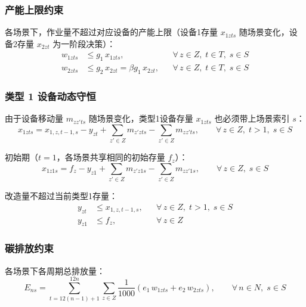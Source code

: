 \documentclass[12pt,a4paper]{article}
\newcommand{\手批注}[2]{\textcolor{#1}{\text{\kaishu #2}}}
\newcommand{\一阶段}{\textcolor{firststage}{\text{\kaishu （一阶段）}}}
\newcommand{\二阶段}{\textcolor{secondstage}{\text{\kaishu （二阶段）}}}
\begin{document}
\subsubsection{产能上限约束}

各场景下，作业量不超过对应设备的产能上限（设备1存量 $x_{1zts}$ 随场景变化，设备2存量 $x_{2zt}$ 为一阶段决策）：
\begin{align}
    w_{1zts} &\leq g_1 \, x_{1zts}, && \forall \, z \in Z, \; t \in T, \; s \in S
    \label{eq:cap1-s} \\[6pt]
    w_{2zts} &\leq g_2 \, x_{2zt} = \beta g_1 \, x_{2zt}, && \forall \, z \in Z, \; t \in T, \; s \in S
    \label{eq:cap2-s}
\end{align}

\subsubsection{类型 1 设备动态守恒}

由于设备移动量 $m_{zz'ts}$ 随场景变化，类型1设备存量 $x_{1zts}$ 也必须带上场景索引 $s$：
\begin{equation}
    x_{1zts} = x_{1,z,t-1,s} - y_{zt} + \sum_{z' \in Z} m_{z'zts} - \sum_{z' \in Z} m_{zz'ts},
    \qquad \forall \, z \in Z, \; t > 1, \; s \in S
    \label{eq:dyn1_t-s}
\end{equation}

初始期（$t=1$，各场景共享相同的初始存量 $f_z$）：
\begin{equation}
    x_{1z1s} = f_z - y_{z1} + \sum_{z' \in Z} m_{z'z1s} - \sum_{z' \in Z} m_{zz'1s},
    \qquad \forall \, z \in Z, \; s \in S
    \label{eq:dyn1_init-s}
\end{equation}

改造量不超过当前类型1存量：
\begin{align}
    y_{zt} &\leq x_{1,z,t-1,s}, && \forall \, z \in Z, \; t > 1, \; s \in S
    \label{eq:y-le-x1-s} \\[6pt]
    y_{z1} &\leq f_z, && \forall \, z \in Z
    \label{eq:y-le-f-s}
\end{align}

\subsubsection{碳排放约束}

各场景下各周期总排放量：
\begin{equation}
    E_{ns} = \sum_{t=12(n-1)+1}^{12n} \sum_{z \in Z}
    \frac{1}{1000} \left( e_1 \, w_{1zts} + e_2 \, w_{2zts} \right),
    \qquad \forall \, n \in N, \; s \in S
    \label{eq:emission-s}
\end{equation}
\end{document}
